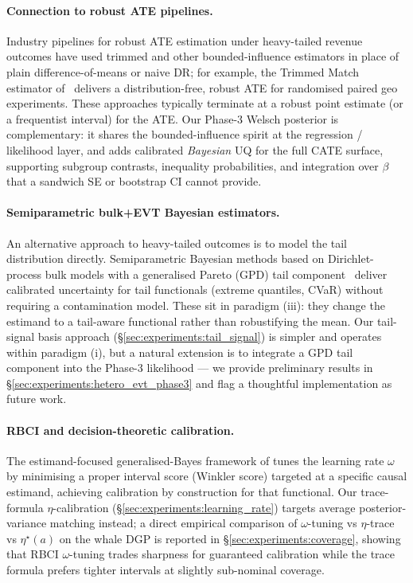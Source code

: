 \paragraph{Connection to robust ATE pipelines.}
Industry pipelines for robust ATE estimation under heavy-tailed
revenue outcomes have used trimmed and other bounded-influence
estimators in place of plain difference-of-means or naive DR; for
example, the Trimmed Match estimator of~\citet{chen2022robust}
delivers a distribution-free, robust ATE for randomised paired
geo experiments. These approaches typically terminate at a robust
point estimate (or a frequentist interval) for the ATE. Our Phase-3
Welsch posterior is complementary: it shares the bounded-influence
spirit at the regression / likelihood layer, and adds calibrated
\emph{Bayesian} UQ for the full CATE surface, supporting subgroup
contrasts, inequality probabilities, and integration over $\beta$
that a sandwich SE or bootstrap CI cannot provide.

\paragraph{Semiparametric bulk+EVT Bayesian estimators.}
An alternative approach to heavy-tailed outcomes is to model the
tail distribution directly. Semiparametric Bayesian methods based
on Dirichlet-process bulk models with a generalised Pareto (GPD)
tail component~\citep{taddy2010bayesian,beirlant2006statistics}
deliver calibrated uncertainty for tail functionals (extreme
quantiles, CVaR) without requiring a contamination model. These sit
in paradigm (iii): they change the estimand to a tail-aware
functional rather than robustifying the mean. Our tail-signal basis
approach (\S\ref{sec:experiments:tail_signal}) is simpler and
operates within paradigm (i), but a natural extension is to
integrate a GPD tail component into the Phase-3 likelihood --- we
provide preliminary results in
\S\ref{sec:experiments:hetero_evt_phase3} and flag a
thoughtful implementation as future work.

\paragraph{RBCI and decision-theoretic calibration.}
The estimand-focused generalised-Bayes framework of
\citet{alexopoulos2025rbci} tunes the learning rate $\omega$ by minimising a
proper interval score (Winkler score) targeted at a specific causal
estimand, achieving calibration by construction for that functional.
Our trace-formula $\eta$-calibration
(\S\ref{sec:experiments:learning_rate}) targets average
posterior-variance matching instead; a direct empirical comparison
of $\omega$-tuning vs $\eta$-trace vs $\eta^\star(a)$ on the whale
DGP is reported in \S\ref{sec:experiments:coverage}, showing
that RBCI $\omega$-tuning trades sharpness for guaranteed
calibration while the trace formula prefers tighter intervals at
slightly sub-nominal coverage.

